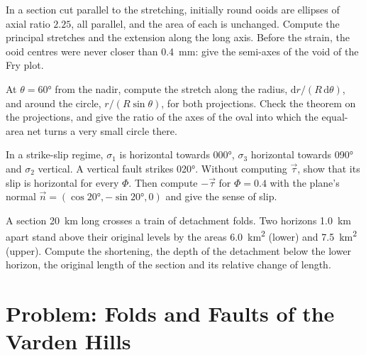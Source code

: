 \begin{exercise}[$\star\star$]\label{exo:b3:structural-analysis:9}
In a section cut parallel to the stretching, initially round ooids are
ellipses of axial ratio $2.25$, all parallel, and the area of each is
unchanged. Compute the principal stretches and the extension along the long
axis. Before the strain, the ooid centres were never closer than
\qty{0.4}{mm}: give the semi-axes of the void of the Fry plot.
\end{exercise}

\begin{exercise}[$\star\star\star$]\label{exo:b3:structural-analysis:10}
At $\theta = \ang{60}$ from the nadir, compute the stretch along the radius,
$\mathrm dr/(R\,\mathrm d\theta)$, and around the circle, $r/(R\sin\theta)$,
for both projections. Check the theorem on the projections, and give the ratio
of the axes of the oval into which the equal-area net turns a very small
circle there.
\end{exercise}

\begin{exercise}[$\star\star\star$]\label{exo:b3:structural-analysis:11}
In a strike-slip regime, $\sigma_1$ is horizontal towards \ang{000},
$\sigma_3$ horizontal towards \ang{090} and $\sigma_2$ vertical. A vertical
fault strikes \ang{020}. Without computing $\vec\tau$, show that its slip is
horizontal for every $\Phi$. Then compute $-\vec\tau$ for $\Phi = 0.4$ with
the plane's normal $\vec n = (\cos\ang{20}, -\sin\ang{20}, 0)$ and give the
sense of slip.
\end{exercise}

\begin{exercise}[$\star\star\star$]\label{exo:b3:structural-analysis:12}
A section \qty{20}{km} long crosses a train of detachment folds. Two horizons
\qty{1.0}{km} apart stand above their original levels by the areas
\qty{6.0}{km^2} (lower) and \qty{7.5}{km^2} (upper). Compute the shortening,
the depth of the detachment below the lower horizon, the original length of
the section and its relative change of length.
\end{exercise}

\section{Problem: Folds and Faults of the Varden Hills}

